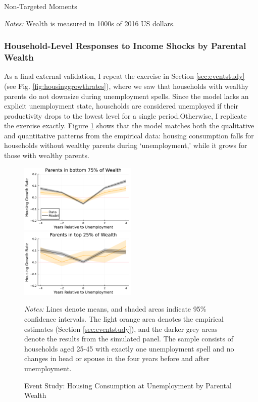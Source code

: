 \documentclass[12pt]{article}
\begin{document}
\begin{table}
	\center 
	\begin{threeparttable}
	\caption{Non-Targeted Moments}\label{tab:nontargeted}
	
	\footnotesize 
	\textit{Notes:} Wealth is measured in 1000s of 2016 US dollars.
\end{threeparttable}
\end{table}

\subsubsection{Household-Level Responses to Income Shocks by Parental Wealth}
As a final external validation, I repeat the exercise in Section \ref{sec:eventstudy} (see Fig. \ref{fig:housinggrowthrates}), where we saw that households with wealthy parents do not downsize during unemployment spells. Since the model lacks an explicit unemployment state, households are considered unemployed if their productivity drops to the lowest level for a single period.Otherwise, I replicate the exercise exactly. Figure \ref{fig:housinggrowthrates_model} shows that the model matches both the qualitative and quantitative patterns from the empirical data: housing consumption falls for households without wealthy parents during ‘unemployment,’ while it grows for those with wealthy parents.

\begin{figure}
	\caption{Event Study: Housing Consumption at Unemployment by Parental Wealth}\label{fig:housinggrowthrates_model}
	\includegraphics[width=0.5\textwidth]{../tabfig/model_housinggrowthpoor_both}%
	\includegraphics[width=0.5\textwidth]{../tabfig/model_housinggrowthrich_both}
	
	{\begin{footnotesize} \textit{Notes:} Lines denote means, and shaded areas indicate 95\% confidence intervals. The light orange area denotes the empirical estimates (Section \ref{sec:eventstudy}), and the darker grey areas denote the results from the simulated panel. The sample consists of households aged 25-45 with exactly one unemployment spell and no changes in head or spouse in the four years before and after unemployment. \end{footnotesize}}
\end{figure}
\end{document}
